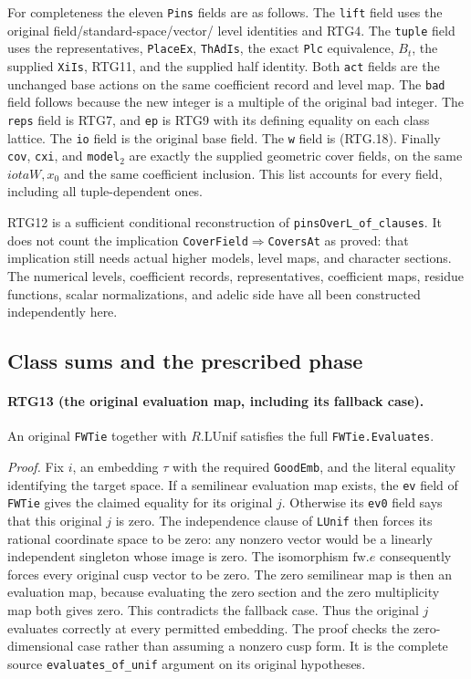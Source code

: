 For completeness the eleven \texttt{Pins} fields are as follows.
The \texttt{lift} field uses the original field/standard-space/vector/
level identities and RTG4.  The \texttt{tuple} field uses the
representatives, \texttt{PlaceEx}, \texttt{ThAdIs}, the exact
\texttt{Plc} equivalence, $B_t$, the supplied \texttt{XiIs}, RTG11,
and the supplied half identity.  Both \texttt{act} fields are the
unchanged base actions on the same coefficient record and level map.
The \texttt{bad} field follows because the new integer is a multiple
of the original bad integer.  The \texttt{reps} field is RTG7, and
\texttt{ep} is RTG9 with its defining equality on each class lattice.
The \texttt{io} field is the original base field.  The \texttt{w} field
is (RTG.18).  Finally \texttt{cov}, \texttt{cxi}, and \texttt{model$_2$}
are exactly the supplied geometric cover fields, on the same
$iotaW,x_0$ and the same coefficient inclusion.  This list accounts for
every field, including all tuple-dependent ones.

RTG12 is a sufficient conditional reconstruction of
\texttt{pinsOverL\_\allowbreak of\_\allowbreak clauses}.  It does not count the implication
\texttt{CoverField}$\Rightarrow$\texttt{CoversAt} as proved: that
implication still needs actual higher models, level maps, and character
sections.  The numerical levels, coefficient records, representatives,
coefficient maps, residue functions, scalar normalizations, and adelic
side have all been constructed independently here.

\subsection{Class sums and the prescribed phase}

\paragraph{RTG13 (the original evaluation map, including its fallback case).}
\label{claim:RTG13}
An original \texttt{FWTie} together with $R.\mathrm{LUnif}$ satisfies
the full \texttt{FWTie.Evaluates}.

\emph{Proof.}
Fix $i$, an embedding $\tau$ with the required \texttt{GoodEmb}, and
the literal equality identifying the target space.  If a semilinear
evaluation map exists, the \texttt{ev} field of \texttt{FWTie} gives
the claimed equality for its original $j$.  Otherwise its \texttt{ev0}
field says that this original $j$ is zero.  The independence clause of
\texttt{LUnif} then forces its rational coordinate space to be zero:
any nonzero vector would be a linearly independent singleton whose image
is zero.  The isomorphism $\mathrm{fw}.e$ consequently forces every
original cusp vector to be zero.  The zero semilinear map is then an
evaluation map, because evaluating the zero section and the zero
multiplicity map both gives zero.  This contradicts the fallback case.
Thus the original $j$ evaluates correctly at every permitted embedding.
The proof checks the zero-dimensional case rather than assuming a
nonzero cusp form.  It is the complete source
\texttt{evaluates\_\allowbreak of\_\allowbreak unif} argument on its original hypotheses.

